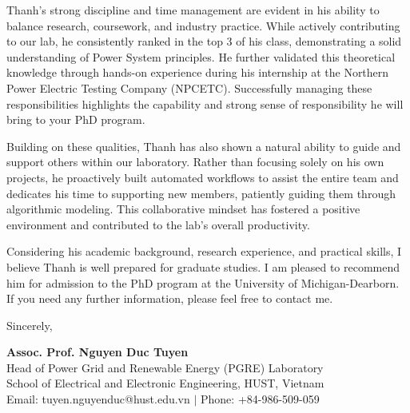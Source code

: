 \documentclass[11pt,letterpaper]{article}
\begin{document}
Thanh's strong discipline and time management are evident in his ability to balance research, coursework, and industry practice. While actively contributing to our lab, he consistently ranked in the top 3 of his class, demonstrating a solid understanding of Power System principles. He further validated this theoretical knowledge through hands-on experience during his internship at the Northern Power Electric Testing Company (NPCETC). Successfully managing these responsibilities highlights the capability and strong sense of responsibility he will bring to your PhD program.

Building on these qualities, Thanh has also shown a natural ability to guide and support others within our laboratory. Rather than focusing solely on his own projects, he proactively built automated workflows to assist the entire team and dedicates his time to supporting new members, patiently guiding them through algorithmic modeling. This collaborative mindset has fostered a positive environment and contributed to the lab's overall productivity.

Considering his academic background, research experience, and practical skills, I believe Thanh is well prepared for graduate studies. I am pleased to recommend him for admission to the PhD program at the University of Michigan-Dearborn. If you need any further information, please feel free to contact me.

\noindent Sincerely,

\vspace{1.5cm}

\noindent \textbf{Assoc. Prof. Nguyen Duc Tuyen}\\
\noindent Head of Power Grid and Renewable Energy (PGRE) Laboratory\\
\noindent School of Electrical and Electronic Engineering, HUST, Vietnam\\
\noindent Email: tuyen.nguyenduc@hust.edu.vn $|$ Phone: +84-986-509-059
\end{document}
